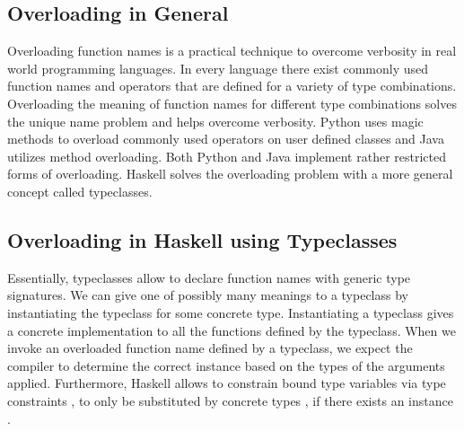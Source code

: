 \subsection{Overloading in General}
Overloading function names is a practical technique to overcome verbosity in real world programming languages. 
In every language there exist commonly used function names and operators that are defined for a variety of type combinations.
Overloading the meaning of function names for different type combinations solves the unique name problem and helps overcome verbosity.
Python uses magic methods to overload commonly used operators on user defined classes and Java utilizes method overloading. Both Python and Java implement rather restricted forms of overloading. Haskell solves the overloading problem with a more general concept called typeclasses.

\subsection{Overloading in Haskell using Typeclasses}
Essentially, typeclasses allow to declare function names with generic type signatures.
We can give one of possibly many meanings to a typeclass by instantiating the typeclass for some concrete type. Instantiating a typeclass gives a concrete implementation to all the functions defined by the typeclass.
When we invoke an overloaded function name defined by a typeclass, we expect the compiler to determine the correct instance based on the types of the arguments applied. 
Furthermore, Haskell allows to constrain bound type variables  via type constraints , to only be substituted by concrete types , if there exists an instance  .

